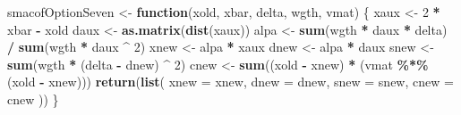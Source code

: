 \documentclass[
  12pt,
]{article}
\newenvironment{Shaded}{\begin{snugshade}}{\end{snugshade}}
\newcommand{\AttributeTok}[1]{\textcolor[rgb]{0.13,0.29,0.53}{#1}}
\newcommand{\ControlFlowTok}[1]{\textcolor[rgb]{0.13,0.29,0.53}{\textbf{#1}}}
\newcommand{\DecValTok}[1]{\textcolor[rgb]{0.00,0.00,0.81}{#1}}
\newcommand{\FunctionTok}[1]{\textcolor[rgb]{0.13,0.29,0.53}{\textbf{#1}}}
\newcommand{\NormalTok}[1]{#1}
\newcommand{\OtherTok}[1]{\textcolor[rgb]{0.56,0.35,0.01}{#1}}
\newcommand{\SpecialCharTok}[1]{\textcolor[rgb]{0.81,0.36,0.00}{\textbf{#1}}}
\begin{document}
\begin{Shaded}
\begin{Highlighting}[]
\NormalTok{smacofOptionSeven }\OtherTok{\textless{}{-}} \ControlFlowTok{function}\NormalTok{(xold, xbar, delta, wgth, vmat) \{}
\NormalTok{  xaux }\OtherTok{\textless{}{-}} \DecValTok{2} \SpecialCharTok{*}\NormalTok{ xbar }\SpecialCharTok{{-}}\NormalTok{ xold}
\NormalTok{  daux }\OtherTok{\textless{}{-}} \FunctionTok{as.matrix}\NormalTok{(}\FunctionTok{dist}\NormalTok{(xaux))}
\NormalTok{  alpa }\OtherTok{\textless{}{-}} \FunctionTok{sum}\NormalTok{(wgth }\SpecialCharTok{*}\NormalTok{ daux }\SpecialCharTok{*}\NormalTok{ delta) }\SpecialCharTok{/} \FunctionTok{sum}\NormalTok{(wgth }\SpecialCharTok{*}\NormalTok{ daux }\SpecialCharTok{\^{}} \DecValTok{2}\NormalTok{)}
\NormalTok{  xnew }\OtherTok{\textless{}{-}}\NormalTok{ alpa }\SpecialCharTok{*}\NormalTok{ xaux}
\NormalTok{  dnew }\OtherTok{\textless{}{-}}\NormalTok{ alpa }\SpecialCharTok{*}\NormalTok{ daux}
\NormalTok{  snew }\OtherTok{\textless{}{-}} \FunctionTok{sum}\NormalTok{(wgth }\SpecialCharTok{*}\NormalTok{ (delta }\SpecialCharTok{{-}}\NormalTok{ dnew) }\SpecialCharTok{\^{}} \DecValTok{2}\NormalTok{)}
\NormalTok{  cnew }\OtherTok{\textless{}{-}} \FunctionTok{sum}\NormalTok{((xold }\SpecialCharTok{{-}}\NormalTok{ xnew) }\SpecialCharTok{*}\NormalTok{ (vmat }\SpecialCharTok{\%*\%}\NormalTok{ (xold }\SpecialCharTok{{-}}\NormalTok{ xnew)))}
  \FunctionTok{return}\NormalTok{(}\FunctionTok{list}\NormalTok{(}
    \AttributeTok{xnew =}\NormalTok{ xnew,}
    \AttributeTok{dnew =}\NormalTok{ dnew,}
    \AttributeTok{snew =}\NormalTok{ snew,}
    \AttributeTok{cnew =}\NormalTok{ cnew}
\NormalTok{  ))}
\NormalTok{\}}


\end{Highlighting}
\end{Shaded}
\end{document}
